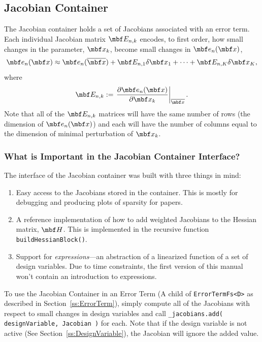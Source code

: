 \documentclass[11pt,a4,oneside]{article}
\newcommand{\txt}[1]{{\footnotesize\texttt{#1}}}
\newcommand{\listcpp}[2]{}
\begin{document}
\subsection{Jacobian Container \label{ss:JacobianContainer}}
The Jacobian container holds a set of Jacobians associated with an error term. Each individual Jacobian matrix $\mbf E_{n,k}$ encodes, to first order, how small changes in the parameter, $\mbf x_k$, become small changes in $\mbf e_n(\mbf x)$,
\begin{equation}
  \label{eq:jacobian-container}
  \mbf e_n(\mbf x) \approx \mbf e_n(\mbfbar x) + \mbf E_{n,1}\mbfdel x_{1} + \dots + \mbf E_{n,K} \mbfdel x_{K},
\end{equation}
where
\begin{equation}
  \label{eq:jacobian-container-mx-definition}
  \mbf E_{n,k} := \left.\pd{\mbf e_n(\mbf x)}{\mbf x_k}\right|_{\mbfbar x}.
\end{equation}
Note that all of the $\mbf E_{n,k}$ matrices will have the same number of rows (the dimension of $\mbf e_n(\mbf x)$) and each will have the number of columns equal to the dimension of minimal perturbation of $\mbf x_k$. 
\listcpp{JacobianContainer.hpp}{../../aslam_backend/include/aslam/backend/JacobianContainer.hpp}

\subsubsection{What is Important in the Jacobian Container Interface?}
The interface of the Jacobian container was built with three things in mind:
\begin{enumerate}
\item Easy access to the Jacobians stored in the container. This is mostly for debugging and producing plots of sparsity for papers.
\item A reference implementation of how to add weighted Jacobians to the Hessian matrix, $\mbf H$. This is implemented in the recursive function \txt{buildHessianBlock()}.
\item Support for {\em expressions}---an abstraction of a linearized function of a set of design variables. Due to time constraints, the first version of this manual won't contain an introduction to expressions.
\end{enumerate}
To use the Jacobian Container in an Error Term (A child of \txt{ErrorTermFs<D>} as described in Section~\ref{ss:ErrorTerm}), simply compute all of the Jacobians with respect to small changes in design variables and call \txt{\_jacobians.add( designVariable, Jacobian )} for each. Note that if the design variable is not active (See Section~\ref{ss:DesignVariable}), the Jacobian will ignore the added value.
\end{document}

